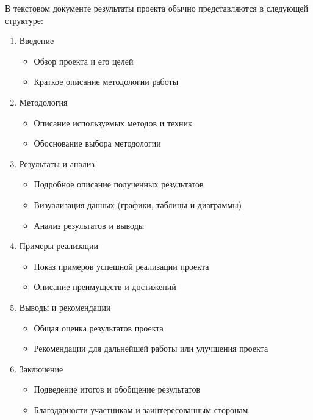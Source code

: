     В текстовом документе результаты проекта обычно представляются в следующей структуре:
    \begin{enumerate}
        \item Введение
            \begin{itemize}
                \item Обзор проекта и его целей
                \item Краткое описание методологии работы
            \end{itemize}
        \item Методология
            \begin{itemize}
                \item Описание используемых методов и техник
                \item Обоснование выбора методологии
            \end{itemize}
        \item Результаты и анализ
            \begin{itemize}
                \item Подробное описание полученных результатов
                \item Визуализация данных (графики, таблицы и диаграммы)
                \item Анализ результатов и выводы
            \end{itemize}
        \item Примеры реализации
            \begin{itemize}
                \item Показ примеров успешной реализации проекта
                \item Описание преимуществ и достижений
            \end{itemize}
        \item Выводы и рекомендации
            \begin{itemize}
                \item Общая оценка результатов проекта
                \item Рекомендации для дальнейшей работы или улучшения проекта
            \end{itemize}
        \item Заключение
            \begin{itemize}
                \item Подведение итогов и обобщение результатов
                \item Благодарности участникам и заинтересованным сторонам
            \end{itemize}
    \end{enumerate}

